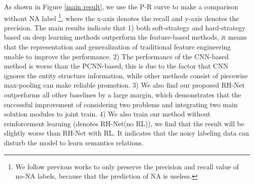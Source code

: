 \documentclass{article}
\begin{document}
As shown in Figure \ref{main result}, we use the P-R curve to make a comparison without NA label \footnote{We follow previous works to only preserve the precision and recall value of no-NA labels, because that the prediction of NA is useless.}, where the x-axis denotes the recall and y-axis denotes the precision. The main results indicate that 1) both soft-strategy and hard-strategy based on deep learning methods outperform the feature-based methods, it means that the representation and generalization of traditional feature engineering unable to improve the performance. 2) The performance of the CNN-based method is worse than the PCNN-based, this is due to the factor that CNN ignores the entity structure information, while other methods consist of piecewise max-pooling can make reliable promotion. 3) We also find our proposed RH-Net outperforms all other baselines by a large margin, which demonstrates that the successful improvement of considering two problems and integrating two main solution modules to joint train. 4) We also train our method without reinforcement learning (denotes RH-Net(no RL)), we find that the result will be slightly worse than RH-Net with RL. It indicates that the noisy labeling data can disturb the model to learn semantics relations.
\end{document}
